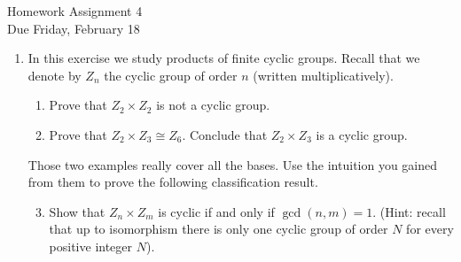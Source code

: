 \documentclass[11pt]{article}
\begin{document}
\begin{center}
\Large {Homework Assignment 4}\\
\small {Due Friday, February 18}
\end{center}
\begin{enumerate}
  \item In this exercise we study products of finite cyclic groups.  Recall that we denote by $Z_n$ the cyclic group of order $n$ (written multiplicatively).
  \begin{enumerate}
    \item Prove that $Z_2\times Z_2$ is not a cyclic group.
    \item Prove that $Z_2\times Z_3\cong Z_6$.  Conclude that $Z_2\times Z_3$ is a cyclic group.
  \end{enumerate}
  Those two examples really cover all the bases.  Use the intuition you gained from them to prove the following classification result.
  \begin{enumerate}
    \setcounter{enumii}{2}
    \item Show that $Z_n\times Z_m$ is cyclic if and only if $\gcd(n,m)=1$.  (Hint: recall that up to isomorphism there is only one cyclic group of order $N$ for every positive integer $N$).
  \end{enumerate}


\end{enumerate}
\end{document}
